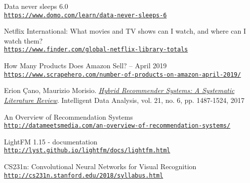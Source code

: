 \begin{thebibliography}{9}

	\hypertarget{domo}{} 
	Data never sleeps 6.0
	\\\texttt{\url{https://www.domo.com/learn/data-never-sleeps-6}}
	
	\hypertarget{finder}{} 
	Netflix International: What movies and TV shows can I watch, and where can I watch them?
	\\\texttt{\url{https://www.finder.com/global-netflix-library-totals}}

	\hypertarget{scrapehero}{} 
	How Many Products Does Amazon Sell? – April 2019
	\\\texttt{\url{https://www.scrapehero.com/number-of-products-on-amazon-april-2019/}}
	
	\hypertarget{ErionCanoMaurizioMorisio}{} 
	Erion Çano, Maurizio Morisio.
	\textit{\href{https://arxiv.org/abs/1901.03888}{Hybrid Recommender Systems: A Systematic Literature Review}}.
	Intelligent Data Analysis, vol. 21, no. 6, pp. 1487-1524, 2017
	
	\hypertarget{datameetsmedia}{} 
	An Overview of Recommendation Systems
	\\\texttt{\url{http://datameetsmedia.com/an-overview-of-recommendation-systems/}}
	
	\hypertarget{lightfm}{} 
	LightFM 1.15 - documentation
	\\\texttt{\url{http://lyst.github.io/lightfm/docs/lightfm.html}}
	
	\hypertarget{cs231n}{} 
	CS231n: Convolutional Neural Networks for Visual Recognition
	\\\texttt{\url{http://cs231n.stanford.edu/2018/syllabus.html}}
	
\end{thebibliography}
